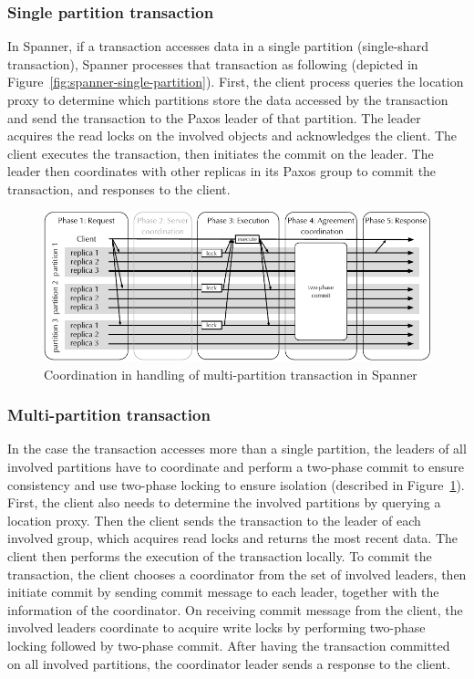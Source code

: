 \subsubsection{Single partition transaction} 
In Spanner, if a transaction accesses data in a single partition (single-shard
transaction), Spanner processes that transaction as following (depicted in
Figure~\ref{fig:spanner-single-partition}). First, the client process queries
the location proxy to determine which partitions store the data accessed by the
transaction and send the transaction to the Paxos leader of that partition. The
leader acquires the read locks on the involved objects and acknowledges the
client. The client executes the transaction, then initiates the commit on the
leader. The leader then coordinates with other replicas in its Paxos group to
commit the transaction, and responses to the client.

\begin{figure}[ht!]
  \begin{minipage}[b]{1.0\linewidth}
  \centering
        \includegraphics[width=1\linewidth]{figures/spanner-multi-partition}
  \end{minipage}
  \caption{Coordination in handling of multi-partition transaction in Spanner}
  \label{fig:spanner-multi-partition}
\end{figure}

\subsubsection{Multi-partition transaction} 
In the case the transaction accesses more than a single partition, the leaders
of all involved partitions have to coordinate and perform a two-phase commit to
ensure consistency and use two-phase locking to ensure isolation (described in
Figure~\ref{fig:spanner-multi-partition}). First, the client also needs to
determine the involved partitions by querying a location proxy. Then the client
sends the transaction to the leader of each involved group, which acquires read
locks and returns the most recent data. The client then performs the execution
of the transaction locally. To commit the transaction, the client chooses a
coordinator from the set of involved leaders, then initiate commit by sending
commit message to each leader, together with the information of the coordinator.
On receiving commit message from the client, the involved leaders coordinate to
acquire write locks by performing two-phase locking followed by two-phase
commit. After having the transaction committed on all involved partitions, the
coordinator leader sends a response to the client.

